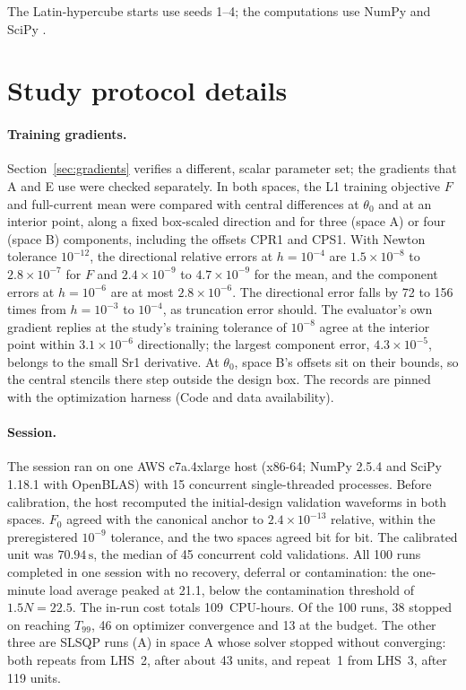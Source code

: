 \documentclass{anvil-paper}
\begin{document}
The Latin-hypercube starts \citep{mckay1979comparison} use seeds 1--4;
the computations use NumPy \citep{harris2020array} and SciPy
\citep{virtanen2020scipy}.

\section{Study protocol details}\label{sec:protocol-details}
\paragraph{Training gradients.}
Section~\ref{sec:gradients} verifies a different, scalar parameter set; the
gradients that A and E use were checked separately. In both spaces, the L1
training objective $F$ and full-current mean were compared with central
differences at $\theta_0$ and at an interior point, along a fixed
box-scaled direction and for three (space A) or four (space B) components,
including the offsets CPR1 and CPS1. With Newton tolerance $10^{-12}$, the
directional relative errors at $h=10^{-4}$ are $1.5\times10^{-8}$ to
$2.8\times10^{-7}$ for $F$ and $2.4\times10^{-9}$ to $4.7\times10^{-9}$ for
the mean, and the component errors at $h=10^{-6}$ are at most
$2.8\times10^{-6}$. The directional error falls by 72 to 156 times from
$h=10^{-3}$ to $10^{-4}$, as truncation error should. The evaluator's own
gradient replies at the study's training tolerance of $10^{-8}$ agree at
the interior point within $3.1\times10^{-6}$ directionally; the largest
component error, $4.3\times10^{-5}$, belongs to the small Sr1 derivative.
At $\theta_0$, space B's offsets sit on their bounds, so the central
stencils there step outside the design box. The records are pinned with the
optimization harness (Code and data availability).

\paragraph{Session.}
The session ran on one AWS c7a.4xlarge host (x86-64; NumPy 2.5.4 and
SciPy 1.18.1 with OpenBLAS) with 15 concurrent single-threaded processes.
Before calibration, the host recomputed the initial-design validation
waveforms in both spaces. $F_0$ agreed with the canonical anchor to
$2.4\times10^{-13}$ relative, within the preregistered $10^{-9}$ tolerance,
and the two spaces agreed bit for bit. The calibrated unit was
$70.94\,\mathrm{s}$, the median of 45 concurrent cold validations. All 100
runs completed in one session with no recovery, deferral or contamination:
the one-minute load average peaked at 21.1, below the contamination
threshold of $1.5N=22.5$. The in-run cost totals 109~CPU-hours. Of the
100 runs, 38 stopped on reaching $T_{99}$, 46 on optimizer convergence and
13 at the budget. The other three are SLSQP runs (A) in space A whose
solver stopped without converging: both repeats from LHS~2, after about 43
units, and repeat~1 from LHS~3, after 119 units.
\end{document}
